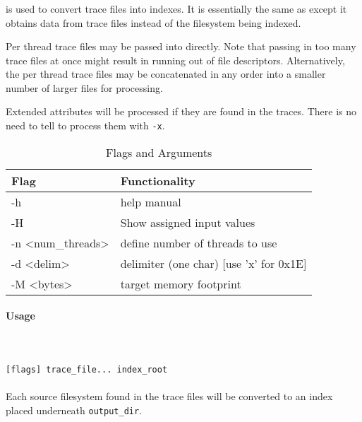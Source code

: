 \subsubsection{\gufitraceindex}
\gufitraceindex is used to convert trace files into indexes. It is
essentially the same as \gufidirindex except it obtains data from
trace files instead of the filesystem being indexed.

Per thread trace files may be passed into \gufitraceindex
directly. Note that passing in too many trace files at once might
result in running out of file descriptors. Alternatively, the per
thread trace files may be concatenated in any order into a smaller
number of larger files for processing.

Extended attributes will be processed if they are found in the traces.
There is no need to tell \gufitraceindex to process them
with \texttt{-x}.

\begin{table} [htb]
  \centering
  \begin{tabular}{l|l}
    Flag & Functionality \\
    \hline
    -h & help manual \\
    \hline
    -H & Show assigned input values \\
    \hline
    -n \textless num\_threads\textgreater & define number of threads to use \\
    \hline
    -d \textless delim\textgreater & delimiter (one char)  [use 'x' for 0x1E] \\
    \hline
    -M \textless bytes\textgreater & target memory footprint \\
    \hline
  \end{tabular}
  \caption{\label{fig:Flags_for_dir2trace} \gufidirtrace Flags and Arguments}
\end{table}

\paragraph{Usage} ~\\\\
\gufitraceindex \texttt{[flags] trace\_file... index\_root} \\\\
Each source filesystem found in the trace files will be converted to an index placed underneath \texttt{output\_dir}.
